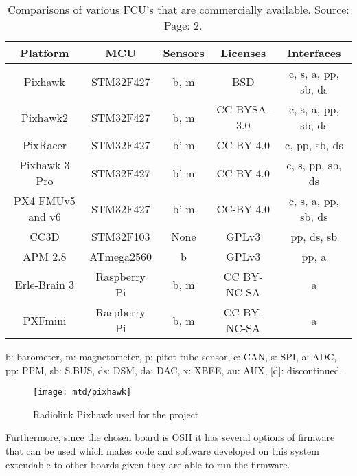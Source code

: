 \begin{table}[h!]
    \centering
    \begin{tabular}{|c | c | c | c | c|}
        \hline
        Platform & MCU & Sensors & Licenses & Interfaces\\
        \hline
        Pixhawk & STM32F427 & b, m & BSD & c, s, a, pp, sb, ds\\

        Pixhawk2 & STM32F427 & b, m & CC-BYSA-3.0 & c, s, a, pp, sb, ds\\

        PixRacer & STM32F427 & b' m & CC-BY 4.0 & c, pp, sb, ds \\

        Pixhawk 3 Pro & STM32F427 & b' m & CC-BY 4.0 & c, s, pp, sb, ds \\

        PX4 FMUv5 and v6 & STM32F427 & b' m & CC-BY 4.0 & c, s, a, pp, sb, ds \\

        CC3D & STM32F103 & None & GPLv3 & pp, ds, sb\\

        APM 2.8 & ATmega2560 & b & GPLv3 & pp, a\\

        Erle-Brain 3 & Raspberry Pi & b, m & CC BY-NC-SA &  a\\

        PXFmini & Raspberry Pi & b, m & CC BY-NC-SA & a\\
        \hline
    \end{tabular}
    \caption{Comparisons of various FCU's that are commercially available. Source: ~\citet{ebeid2018survey} Page: 2.}
    \label{tb:comparison}
    b: barometer, m: magnetometer, p: pitot tube sensor, c: CAN, s: SPI, a: ADC, pp:
PPM, sb: S.BUS, ds: DSM, da: DAC, x: XBEE, au: AUX, [d]: discontinued.
\end{table}

\begin{figure}[ht!]
    \centering
    \texttt{[image: mtd/pixhawk]}
    \caption{Radiolink Pixhawk used for the project}
    \label{fig:pix}
\end{figure}

Furthermore, since the chosen board is OSH it has several options of firmware that can be used which makes code and software developed on this system extendable to other boards given they are able to run the firmware.
\newpage

